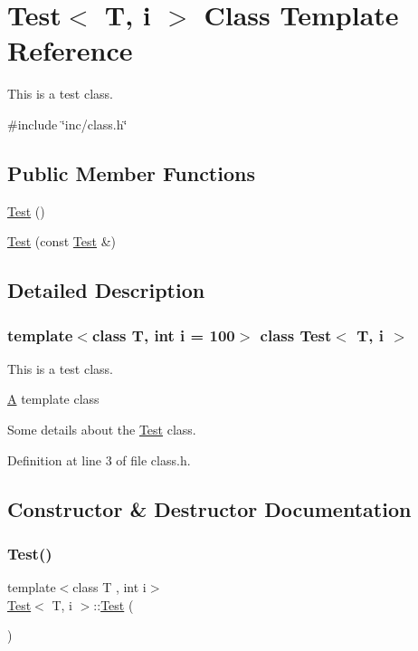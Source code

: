 \hypertarget{class_test}{}\section{Test$<$ T, i $>$ Class Template Reference}
\label{class_test}


This is a test class.  




{\ttfamily \#include \char`\"{}inc/class.\+h\char`\"{}}

\subsection*{Public Member Functions}
\begin{DoxyCompactItemize}
\item 
\mbox{\hyperlink{class_test_a44e3a28c552193de099601e2910531f1}{Test}} ()
\item 
\mbox{\hyperlink{class_test_adcf1bc755df94c4d07519c0a02aa1cc0}{Test}} (const \mbox{\hyperlink{class_test}{Test}} \&)
\end{DoxyCompactItemize}


\subsection{Detailed Description}
\subsubsection*{template$<$class T, int i = 100$>$\newline
class Test$<$ T, i $>$}

This is a test class. 

\mbox{\hyperlink{class_a}{A}} template class

Some details about the \mbox{\hyperlink{class_test}{Test}} class. 

Definition at line 3 of file class.\+h.



\subsection{Constructor \& Destructor Documentation}
\mbox{\label{class_test_a44e3a28c552193de099601e2910531f1}} 
\subsubsection{\texorpdfstring{Test()}{Test()}\hspace{0.1cm}{\footnotesize\ttfamily [1/2]}}
{\footnotesize\ttfamily template$<$class T , int i$>$ \\
\mbox{\hyperlink{class_test}{Test}}$<$ T, i $>$\+::\mbox{\hyperlink{class_test}{Test}} (\begin{DoxyParamCaption}{ }\end{DoxyParamCaption})}

